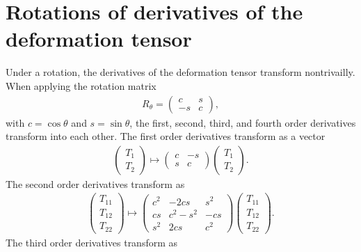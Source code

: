 \documentclass[a4paper, 11pt]{article}
\begin{document}
\section{Rotations of derivatives of the deformation tensor}\label{ap:rotations}
Under a rotation, the derivatives of the deformation tensor transform nontrivailly. When applying the rotation matrix
\begin{align}
R_\theta = \begin{pmatrix} c  & s  \\- s  & c \end{pmatrix},
\end{align}
with $c=\cos\theta$ and $s=\sin \theta$, the first, second, third, and fourth order derivatives transform into each other. The first order derivatives transform as a vector
\begin{align}
\begin{pmatrix} T_1 \\ T_2 \end{pmatrix}
\mapsto
\begin{pmatrix}
c & -s \\
s &  c 
\end{pmatrix}
\begin{pmatrix} T_1 \\ T_2 \end{pmatrix}.
\end{align}
The second order derivatives transform as
\begin{align}
\begin{pmatrix} T_{11} \\ T_{12} \\ T_{22} \end{pmatrix}
\mapsto
\begin{pmatrix}
c^2 & -2 c s    &  s^2 \\
c s &  c^2- s^2 & -c s \\
s^2 & 2c s      &  c^2 
\end{pmatrix}
\begin{pmatrix} T_{11} \\ T_{12} \\ T_{22} \end{pmatrix}.
\end{align}
The third order derivatives transform as
\end{document}
